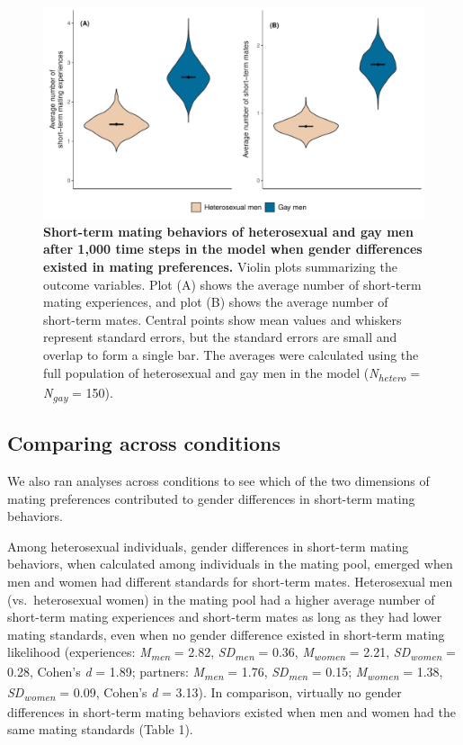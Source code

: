 \documentclass[
  11pt,
]{article}
\begin{document}
\begin{figure}[h]
  \centering
  \includegraphics[width=0.8\columnwidth]{figures/fig3_hetero_vs_gay_men.pdf}
  \caption{\textbf{Short-term mating behaviors of heterosexual and gay men after 1,000 time steps in the model when gender differences existed in mating preferences.} Violin plots summarizing the outcome variables. Plot (A) shows the average number of short-term mating experiences, and plot (B) shows the average number of short-term mates. Central points show mean values and whiskers represent standard errors, but the standard errors are small and overlap to form a single bar. The averages were calculated using the full population of heterosexual and gay men in the model (\textit{N\textsubscript{hetero}} = \textit{N\textsubscript{gay}} = 150).}
  \label{fig:hetero_vs_gay}
\end{figure}

\hypertarget{comparing-across-conditions}{%
\subsection{Comparing across
conditions}\label{comparing-across-conditions}}

We also ran analyses across conditions to see which of the two
dimensions of mating preferences contributed to gender differences in
short-term mating behaviors.

Among heterosexual individuals, gender differences in short-term mating
behaviors, when calculated among individuals in the mating pool, emerged
when men and women had different standards for short-term mates.
Heterosexual men (vs.~heterosexual women) in the mating pool had a
higher average number of short-term mating experiences and short-term
mates as long as they had lower mating standards, even when no gender
difference existed in short-term mating likelihood (experiences:
\emph{M\textsubscript{men}} = 2.82, \emph{SD\textsubscript{men}} = 0.36,
\emph{M\textsubscript{women}} = 2.21, \emph{SD\textsubscript{women}} =
0.28, Cohen's \emph{d} = 1.89; partners: \emph{M\textsubscript{men}} =
1.76, \emph{SD\textsubscript{men}} = 0.15; \emph{M\textsubscript{women}}
= 1.38, \emph{SD\textsubscript{women}} = 0.09, Cohen's \emph{d} = 3.13).
In comparison, virtually no gender differences in short-term mating
behaviors existed when men and women had the same mating standards
(Table 1).
\end{document}
